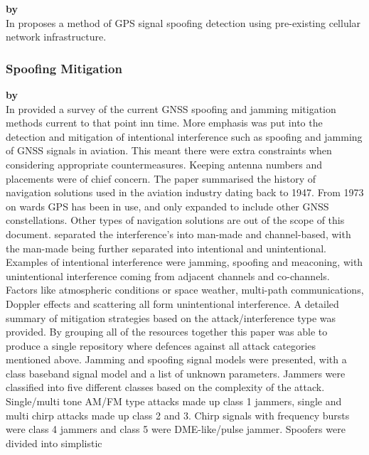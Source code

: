 \medskip

\textbf{\emph{} by \citeauthor{RN26}} \\
In \citeyear{RN26} \citeauthor{RN26} \cite{RN26} proposes a method of GPS signal spoofing detection using pre-existing cellular network infrastructure.

\subsubsection{Spoofing Mitigation}

\textbf{\emph{} by \citeauthor{RN34}} \\
In \citeyear{RN34} \citeauthor{RN34} \cite{RN34} provided a survey of the current GNSS spoofing and jamming mitigation methods current to that point inn time. More
emphasis was put into the detection and mitigation of intentional interference such as spoofing and jamming of GNSS signals in aviation. This meant there were extra
constraints when considering appropriate countermeasures. Keeping antenna numbers and placements were of chief concern. The paper summarised the history of navigation
solutions used in the aviation industry dating back to 1947. From 1973 on wards GPS has been in use, and only expanded to include other GNSS constellations. Other types
of navigation solutions are out of the scope of this document.
\citeauthor{RN34} separated the interference's into man-made and channel-based, with the man-made being further separated into intentional and unintentional. Examples of
intentional interference were jamming, spoofing and meaconing, with unintentional interference coming from adjacent channels and co-channels. Factors like atmospheric
conditions or space weather, multi-path communications, Doppler effects and scattering all form unintentional interference. A detailed summary of mitigation strategies
based on the attack/interference type was provided. By grouping all of the resources together this paper was able to produce a single repository where defences against
all attack categories mentioned above. Jamming and spoofing signal models were presented, with a class baseband signal model and a list of unknown parameters. Jammers
were classified into five different classes based on the complexity of the attack. Single/multi tone AM/FM type attacks made up class 1 jammers, single and multi chirp
attacks made up class 2 and 3. Chirp signals with frequency bursts were class 4 jammers and class 5 were DME-like/pulse jammer. Spoofers were divided into simplistic
